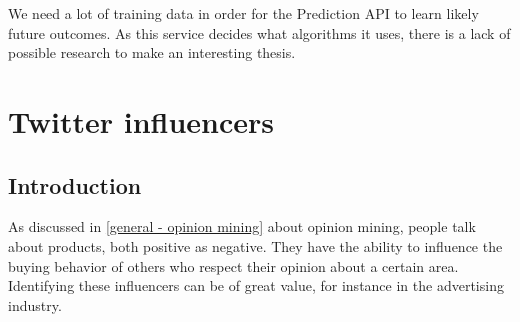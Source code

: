 We need a lot of training data in order for the Prediction API to learn likely future outcomes. As this service decides what algorithms it uses, there is a lack of possible research to make an interesting thesis.




\section{Twitter influencers}

\subsection{Introduction}
As discussed in \ref{general - opinion mining} about opinion mining, people talk about products, both positive as negative. They have the ability to influence the buying behavior of others who respect their opinion about a certain area. Identifying these influencers can be of great value, for instance in the advertising industry.

